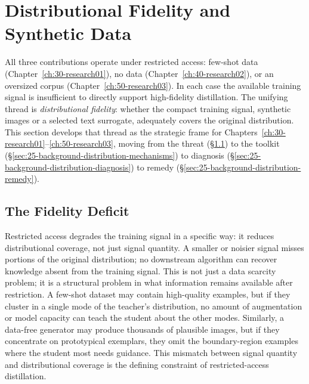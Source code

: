 \section{Distributional Fidelity and Synthetic Data} \label{sec:25-background-distribution}
\begin{foldable}
  All three contributions operate under restricted access: few-shot data (Chapter~\ref{ch:30-research01}), no data (Chapter~\ref{ch:40-research02}), or an oversized corpus (Chapter~\ref{ch:50-research03}).
  In each case the available training signal is insufficient to directly support high-fidelity distillation.
  The unifying thread is \textit{distributional fidelity}: whether the compact training signal, synthetic images or a selected text surrogate, adequately covers the original distribution.
  This section develops that thread as the strategic frame for Chapters~\ref{ch:30-research01}--\ref{ch:50-research03}, moving from the threat (\S\ref{sec:25-background-distribution-deficit}) to the toolkit (\S\ref{sec:25-background-distribution-mechanisms}) to diagnosis (\S\ref{sec:25-background-distribution-diagnosis}) to remedy (\S\ref{sec:25-background-distribution-remedy}).
\end{foldable}

\subsection{The Fidelity Deficit} \label{sec:25-background-distribution-deficit}
\begin{foldable}
  Restricted access degrades the training signal in a specific way: it reduces distributional coverage, not just signal quantity.
  A smaller or noisier signal misses portions of the original distribution; no downstream algorithm can recover knowledge absent from the training signal.
  This is not just a data scarcity problem; it is a structural problem in what information remains available after restriction.
  A few-shot dataset may contain high-quality examples, but if they cluster in a single mode of the teacher's distribution, no amount of augmentation or model capacity can teach the student about the other modes.
  Similarly, a data-free generator may produce thousands of plausible images, but if they concentrate on prototypical exemplars, they omit the boundary-region examples where the student most needs guidance.
  This mismatch between signal quantity and distributional coverage is the defining constraint of restricted-access distillation.
\end{foldable}

